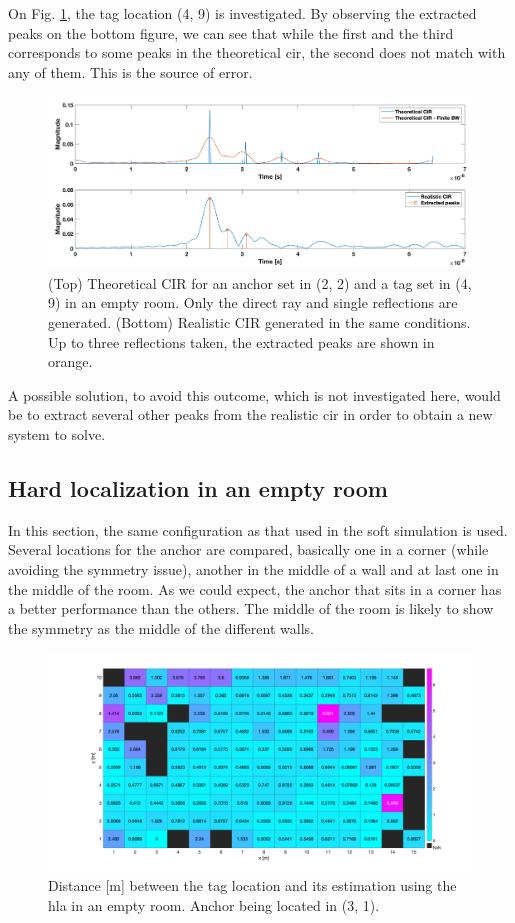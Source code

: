 On Fig. \ref{fig:cir_4_9}, the tag location (4, 9) is investigated. By observing the extracted peaks on the bottom figure, we can see that while the first and the third corresponds to some peaks in the theoretical \gls{cir}, the second does not match with any of them. This is the source of error. 

\begin{figure}[H]
\centering
\includegraphics[width=.9\linewidth]{Images/hla_images/cir_4_9.png}
\caption{(Top) Theoretical CIR for an anchor set in (2, 2) and a tag set in (4, 9) in an empty room. Only the direct ray and single reflections are generated. (Bottom) Realistic CIR generated in the same conditions. Up to three reflections taken, the extracted peaks are shown in orange.\label{fig:cir_4_9}}
\end{figure}

A possible solution, to avoid this outcome, which is not investigated here, would be to extract several other peaks from the realistic \gls{cir} in order to obtain a new system to solve. 

\subsection{Hard localization in an empty room}

In this section, the same configuration as that used in the soft simulation is used. Several locations for the anchor are compared, basically one in a corner (while avoiding the symmetry issue), another in the middle of a wall and at last one in the middle of the room. As we could expect, the anchor that sits in a corner has a better performance than the others. The middle of the room is likely to show the symmetry as the middle of the different walls.

\begin{figure}[H]
\centering
\includegraphics[width=.9\linewidth]{Images/hla_images/hla_anchor_(3_1).png}
\caption{Distance [m] between the tag location and its estimation using the \gls{hla} in an empty room. Anchor being located in (3, 1). \label{fig:hla_empty_1}}
\end{figure}

